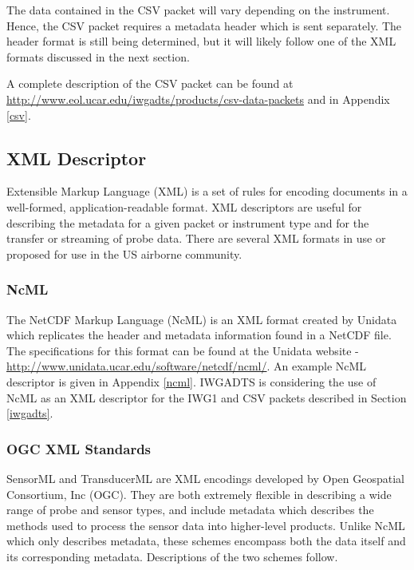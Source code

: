 The data contained in the CSV packet will vary depending on the instrument.  Hence, the CSV packet requires a metadata header which is sent separately.  The header format is still being determined, but it will likely follow one of the XML formats discussed in the next section.  

A complete description of the CSV packet can be found at \href{http://www.eol.ucar.edu/iwgadts/products/csv-data-packets}{http://www.eol.ucar.edu/iwgadts/products/csv-data-packets} and in Appendix \ref{csv}.


\subsection{XML Descriptor}
%
Extensible Markup Language (XML) is a set of rules for encoding documents in a well-formed, application-readable format.  XML descriptors are useful for describing the metadata for a given packet or instrument type and for the transfer or streaming of probe data.  There are several XML formats in use or proposed for use in the US airborne community.

\subsubsection{NcML}
%
The NetCDF Markup Language (NcML) is an XML format created by Unidata which replicates the header and metadata information found in a NetCDF file.  The specifications for this format can be found at the Unidata website - \href{http://www.unidata.ucar.edu/software/netcdf/ncml/}{http://www.unidata.ucar.edu/software/netcdf/ncml/}.  An example NcML descriptor is given in Appendix \ref{ncml}.  IWGADTS is considering the use of NcML as an XML descriptor for the IWG1 and CSV packets described in Section \ref{iwgadts}.  

\subsubsection{OGC XML Standards}
%
SensorML and TransducerML are XML encodings developed by Open Geospatial Consortium, Inc (OGC).  They are both extremely flexible in describing a wide range of probe and sensor types, and include metadata which describes the methods used to process the sensor data into higher-level products.  Unlike NcML which only describes metadata, these schemes encompass both the data itself and its corresponding metadata.  Descriptions of the two schemes follow. 

